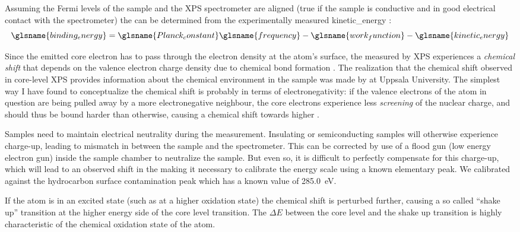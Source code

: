 \documentclass[webedition,openright,titles,swedish,english]{LuaUUThesis}\usepackage[]{graphicx}\usepackage[]{xcolor}
\begin{document}
Assuming the Fermi levels of the sample and the \gls{XPS} spectrometer
are aligned (true if the sample is conductive and in good electrical contact with the spectrometer)
the  can be determined from the experimentally measured
\gls{kinetic_energy} \cite{Greczynski2023}:
\begin{equation}
\glsname{binding_energy} =
\glsname{Planck_constant}\glsname{frequency} - \glsname{work_function} - \glsname{kinetic_energy}
\end{equation}

Since the emitted core electron has to pass through the electron density
at the atom's surface, the  measured by \gls{XPS}
experiences a \emph{chemical shift} that depends on the valence electron charge density
due to chemical bond formation \cite{Greczynski2023}.
The realization that the chemical shift observed in core-level \gls{XPS}
provides information about the chemical environment in the sample
was made by \textcite{Siegbahn1968} at Uppsala University.
The simplest way I have found to conceptualize the chemical shift is probably in terms of
electronegativity: if the valence electrons of the atom in question are being
pulled away by a more electronegative neighbour, the core electrons experience
less \emph{screening} of the nuclear charge, and should thus be bound harder
than otherwise, causing a chemical shift towards higher .

Samples need to maintain electrical neutrality during the measurement.
Insulating or semiconducting samples will otherwise experience charge-up, leading to
mismatch in  between the sample and the spectrometer.
This can be corrected by use of a flood gun (low energy electron gun)
inside the sample chamber to neutralize the sample.
But even so, it is difficult to perfectly compensate for this charge-up, which
will lead to an observed shift in the  making it
necessary to calibrate the energy scale using a known elementary peak.
We calibrated against the hydrocarbon surface contamination peak
 which has a known value of \qty{285.0}{\eV}.

If the atom is in an excited state (such as at a higher oxidation state)
the chemical shift is perturbed further, causing a so called \enquote{shake up}
transition at the higher energy side of the core level transition.
The $\Delta E$ between the core level and the shake up transition is highly
characteristic of the chemical oxidation state of the atom.
\end{document}
